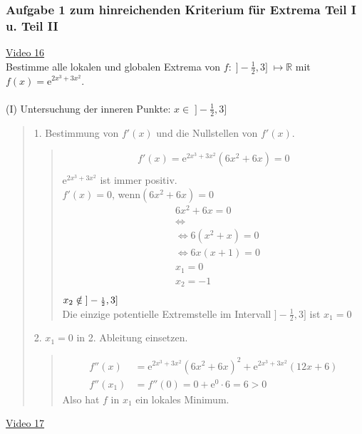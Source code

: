\subsubsection{Aufgabe 1 zum hinreichenden Kriterium für Extrema Teil I u. Teil II}
\href{https://youtu.be/Anjy9d6Qu2Y}{Video 16}\\
Bestimme alle lokalen und globalen Extrema von $ f:\;]-\frac{1}{2},3]\;\longmapsto \mathbb{R} $ mit $ f(x)=\mathrm{e}^{2x^3+3x^2} $.\\
\\
(I) Untersuchung der inneren Punkte: $ x\in\;]-\frac{1}{2},3] $\\
\begin{quote}
1. Bestimmung von $ f'(x) $ und die Nullstellen von $ f'(x) $.\\
\begin{quote}
\begin{align*}
f'(x)=\mathrm{e}^{2x^3+3x^2}(6x^2+6x)=0\\
\end{align*}
$ \mathrm{e}^{2x^3+3x^2} $ ist immer positiv.\\
$ f'(x)=0 $, wenn$ (6x^2+6x)=0 $\\
\begin{align*}
&6x^2+6x=0\\
&\Leftrightarrow\\
&\Leftrightarrow 6(x^2+x)=0\\
&\Leftrightarrow 6x(x+1)=0\\
&x_1=0\\
&x_2=-1\\
\end{align*}
$ x_2 \notin \;]-\genfrac{}{}{}{2}{1 }{2 },3] $\\
Die einzige potentielle Extremstelle im Intervall $ ]-\frac{1}{2},3] $ ist $x_1=0  $\\
\end{quote}
2. $ x_1=0 $ in 2. Ableitung einsetzen.\\
\begin{quote}
\begin{align*}
f''(x)&=\mathrm{e}^{2x^3+3x^2}(6x^2+6x)^2+\mathrm{e}^{2x^3+3x^2}(12x+6)\\
f''(x_1)&=f''(0)=0+\mathrm{e}^0\cdot 6=6>0
\end{align*}
Also hat $ f $ in $ x_1 $ ein lokales Minimum.\\
\end{quote}
\end{quote}
\href{https://youtu.be/xKTPSfSrtGo}{Video 17}\\
